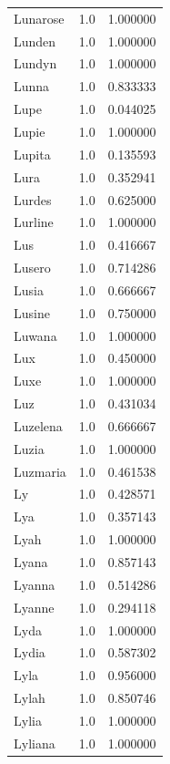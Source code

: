 \documentclass[
  letterpaper,
  DIV=11,
  numbers=noendperiod]{scrreprt}
\begin{document}
\begin{tabular}{lrr}
Lunarose        &   1.0 &   1.000000 \\
Lunden          &   1.0 &   1.000000 \\
Lundyn          &   1.0 &   1.000000 \\
Lunna           &   1.0 &   0.833333 \\
Lupe            &   1.0 &   0.044025 \\
Lupie           &   1.0 &   1.000000 \\
Lupita          &   1.0 &   0.135593 \\
Lura            &   1.0 &   0.352941 \\
Lurdes          &   1.0 &   0.625000 \\
Lurline         &   1.0 &   1.000000 \\
Lus             &   1.0 &   0.416667 \\
Lusero          &   1.0 &   0.714286 \\
Lusia           &   1.0 &   0.666667 \\
Lusine          &   1.0 &   0.750000 \\
Luwana          &   1.0 &   1.000000 \\
Lux             &   1.0 &   0.450000 \\
Luxe            &   1.0 &   1.000000 \\
Luz             &   1.0 &   0.431034 \\
Luzelena        &   1.0 &   0.666667 \\
Luzia           &   1.0 &   1.000000 \\
Luzmaria        &   1.0 &   0.461538 \\
Ly              &   1.0 &   0.428571 \\
Lya             &   1.0 &   0.357143 \\
Lyah            &   1.0 &   1.000000 \\
Lyana           &   1.0 &   0.857143 \\
Lyanna          &   1.0 &   0.514286 \\
Lyanne          &   1.0 &   0.294118 \\
Lyda            &   1.0 &   1.000000 \\
Lydia           &   1.0 &   0.587302 \\
Lyla            &   1.0 &   0.956000 \\
Lylah           &   1.0 &   0.850746 \\
Lylia           &   1.0 &   1.000000 \\
Lyliana         &   1.0 &   1.000000 \\

\end{tabular}
\end{document}
